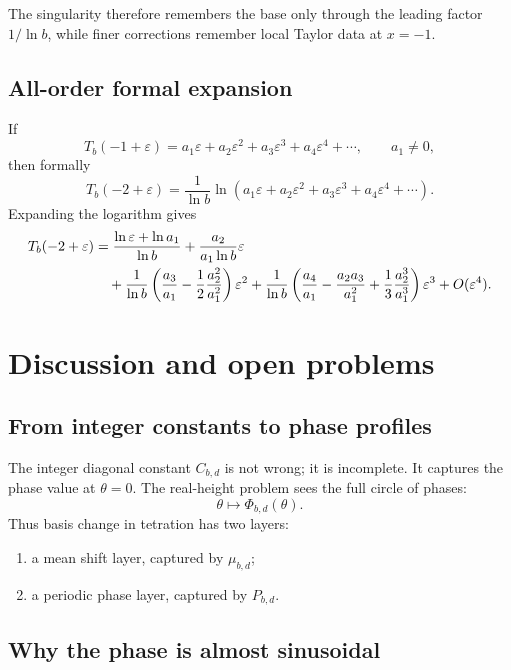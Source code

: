 \documentclass[11pt,a4paper]{article}
\theoremstyle{plain}
\theoremstyle{definition}
\theoremstyle{remark}
\begin{document}
The singularity therefore remembers the base only through the leading factor $1/\ln b$, while finer corrections remember local Taylor data at $x=-1$.

\subsection{All-order formal expansion}

If
\[
  T_b(-1+\varepsilon)=a_1\varepsilon+a_2\varepsilon^2+a_3\varepsilon^3+a_4\varepsilon^4+\cdots,
  \qquad a_1\ne0,
\]
then formally
\begin{equation}\label{eq:all-order-singularity}
  T_b(-2+\varepsilon)=\frac1{\ln b}\ln\left(a_1\varepsilon+a_2\varepsilon^2+a_3\varepsilon^3+a_4\varepsilon^4+\cdots\right).
\end{equation}
Expanding the logarithm gives
\begin{align}\label{eq:all-order-expanded}
  T_b(-2+\varepsilon)
  &=\frac{\ln\varepsilon+\ln a_1}{\ln b}
  +\frac{a_2}{a_1\ln b}\varepsilon\notag\\
  &\quad+\frac1{\ln b}\left(\frac{a_3}{a_1}-\frac12\frac{a_2^2}{a_1^2}\right)\varepsilon^2
  +\frac1{\ln b}\left(\frac{a_4}{a_1}-\frac{a_2a_3}{a_1^2}+\frac13\frac{a_2^3}{a_1^3}\right)\varepsilon^3+O(\varepsilon^4).
\end{align}

\section{Discussion and open problems}

\subsection{From integer constants to phase profiles}

The integer diagonal constant $C_{b,d}$ is not wrong; it is incomplete.  It captures the phase value at $\theta=0$.  The real-height problem sees the full circle of phases:
\[
  \theta\mapsto\Phi_{b,d}(\theta).
\]
Thus basis change in tetration has two layers:
\begin{enumerate}[label=(\arabic*),leftmargin=2em]
  \item a mean shift layer, captured by $\mu_{b,d}$;
  \item a periodic phase layer, captured by $P_{b,d}$.
\end{enumerate}

\subsection{Why the phase is almost sinusoidal}
\end{document}
